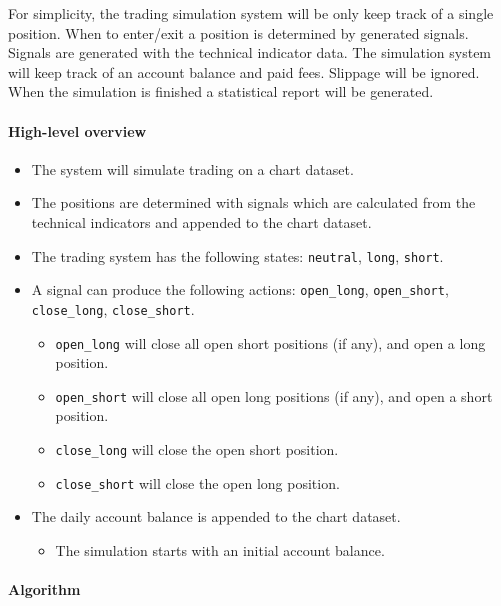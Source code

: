 \documentclass[11pt]{article}
\providecommand{\tightlist}{%
      \setlength{\itemsep}{0pt}\setlength{\parskip}{0pt}}
\begin{document}
    For simplicity, the trading simulation system will be only keep track of
a single position. When to enter/exit a position is determined by
generated signals. Signals are generated with the technical indicator
data. The simulation system will keep track of an account balance and
paid fees. Slippage will be ignored. When the simulation is finished a
statistical report will be generated.

    \hypertarget{high-level-overview}{%
\paragraph{High-level overview}\label{high-level-overview}}

    \begin{itemize}
\tightlist
\item
  The system will simulate trading on a chart dataset.
\item
  The positions are determined with signals which are calculated from
  the technical indicators and appended to the chart dataset.
\item
  The trading system has the following states: \texttt{neutral},
  \texttt{long}, \texttt{short}.
\item
  A signal can produce the following actions: \texttt{open\_long},
  \texttt{open\_short}, \texttt{close\_long}, \texttt{close\_short}.

  \begin{itemize}
  \tightlist
  \item
    \texttt{open\_long} will close all open short positions (if any),
    and open a long position.
  \item
    \texttt{open\_short} will close all open long positions (if any),
    and open a short position.
  \item
    \texttt{close\_long} will close the open short position.
  \item
    \texttt{close\_short} will close the open long position.
  \end{itemize}
\item
  The daily account balance is appended to the chart dataset.

  \begin{itemize}
  \tightlist
  \item
    The simulation starts with an initial account balance.
  \end{itemize}
\end{itemize}

    \hypertarget{algorithm}{%
\paragraph{Algorithm}\label{algorithm}}
\end{document}
